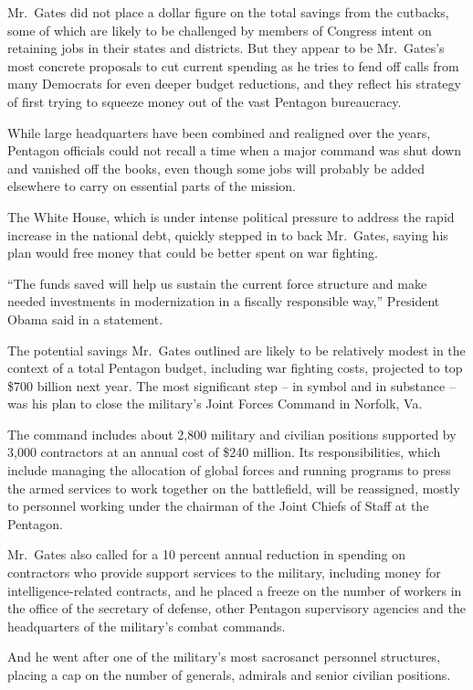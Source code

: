 ﻿\documentclass[12pt]{article}
\begin{document}
Mr.~Gates did not place a dollar figure on the total savings from the cutbacks, some of which are
likely to be challenged by members of Congress intent on retaining jobs in their states and
districts. But they appear to be Mr.~Gates's most concrete proposals to cut current spending as he
tries to fend off calls from many Democrats for even deeper budget reductions, and they reflect his
strategy of first trying to squeeze money out of the vast Pentagon bureaucracy.

While large headquarters have been combined and realigned over the years, Pentagon officials could
not recall a time when a major command was shut down and vanished off the books, even though some
jobs will probably be added elsewhere to carry on essential parts of the mission.

The White House, which is under intense political pressure to address the rapid increase in the
national debt, quickly stepped in to back Mr.~Gates, saying his plan would free money that could be
better spent on war fighting.

``The funds saved will help us sustain the current force structure and make needed investments in
modernization in a fiscally responsible way,'' President Obama said in a statement.

The potential savings Mr.~Gates outlined are likely to be relatively modest in the context of a
total Pentagon budget, including war fighting costs, projected to top \$700 billion next year. The
most significant step -- in symbol and in substance -- was his plan to close the military's Joint
Forces Command in Norfolk, Va.

The command includes about 2,800 military and civilian positions supported by 3,000 contractors at
an annual cost of \$240 million. Its responsibilities, which include managing the allocation of
global forces and running programs to press the armed services to work together on the battlefield,
will be reassigned, mostly to personnel working under the chairman of the Joint Chiefs of Staff at
the Pentagon.

Mr.~Gates also called for a 10 percent annual reduction in spending on contractors who provide
support services to the military, including money for intelligence-related contracts, and he placed
a freeze on the number of workers in the office of the secretary of defense, other Pentagon
supervisory agencies and the headquarters of the military's combat commands.

And he went after one of the military's most sacrosanct personnel structures, placing a cap on the
number of generals, admirals and senior civilian positions.
\end{document}
